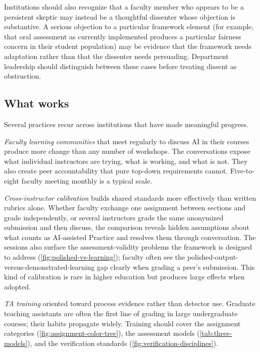 \documentclass{SIAMbook2023}
\begin{document}
Institutions should also recognize that a faculty member who appears to be a persistent skeptic may instead be a thoughtful dissenter whose objection is substantive. A serious objection to a particular framework element (for example, that oral assessment as currently implemented produces a particular fairness concern in their student population) may be evidence that the framework needs adaptation rather than that the dissenter needs persuading. Department leadership should distinguish between these cases before treating dissent as obstruction.

\subsection{What works}
\label{u:subsec:what-works}

Several practices recur across institutions that have made meaningful progress.

\textit{Faculty learning communities} that meet regularly to discuss AI in their courses produce more change than any number of workshops. The conversations expose what individual instructors are trying, what is working, and what is not. They also create peer accountability that pure top-down requirements cannot. Five-to-eight faculty meeting monthly is a typical scale.

\textit{Cross-instructor calibration} builds shared standards more effectively than written rubrics alone. Whether faculty exchange one assignment between sections and grade independently, or several instructors grade the same anonymized submission and then discuss, the comparison reveals hidden assumptions about what counts as AI-assisted Practice and resolves them through conversation. The sessions also surface the assessment-validity problems the framework is designed to address (\cref{fig:polished-vs-learning}); faculty often see the polished-output-versus-demonstrated-learning gap clearly when grading a peer's submission. This kind of calibration is rare in higher education but produces large effects when adopted.

\textit{TA training} oriented toward process evidence rather than detector use. Graduate teaching assistants are often the first line of grading in large undergraduate courses; their habits propagate widely. Training should cover the assignment categories (\cref{fig:assignment-color-tree}), the assessment models (\cref{tab:three-models}), and the verification standards (\cref{fig:verification-disciplines}).
\end{document}
